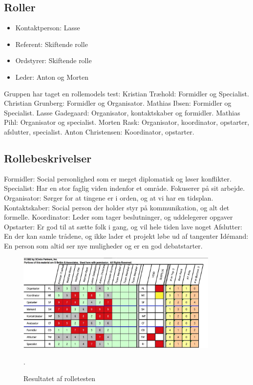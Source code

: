 \documentclass[oneside,a4paper,titlepage]{article}
\begin{document}
\subsection*{Roller}
\begin{itemize}
  \item Kontaktperson: Lasse
  \item Referent: Skiftende rolle
  \item Ordstyrer: Skiftende rolle
  \item Leder: Anton og Morten
\end{itemize}
Gruppen har taget en rollemodels test: \newline
Kristian Træhold: Formidler og Specialist. \newline
Christian Grunberg: Formidler og Organisator.\newline
Mathias Ibsen: Formidler og Specialist.\newline
Lasse Gadegaard: Organisator, kontaktskaber og formidler.\newline
Mathias Pihl: Organisator og specialist.\newline
Morten Rask: Organisator, koordinator, opstarter, afslutter, specialist.\newline
Anton Christensen: Koordinator, opstarter.\newline

\subsection*{Rollebeskrivelser}
Formidler: Social personlighed som er meget diplomatisk og løser konflikter.
Specialist: Har en stor faglig viden indenfor et område. Fokuserer på sit arbejde.
Organisator: Sørger for at tingene er i orden, og at vi har en tidsplan.
Kontaktskaber: Social person der holder styr på kommunikation, og alt det formelle.
Koordinator: Leder som tager beslutninger, og uddelegerer opgaver
Opstarter: Er god til at sætte folk i gang, og vil hele tiden lave noget
Afslutter: En der kan samle trådene, og ikke lader et projekt løbe ud af tangenter
Idémand: En person som altid ser nye muligheder og er en god debatstarter.

\begin{figure}[H]
   \centering
   \includegraphics[width=10cm]{graphics/rolletest}
   \caption{Resultatet af rolletesten}.
\end{figure}
\end{document}
